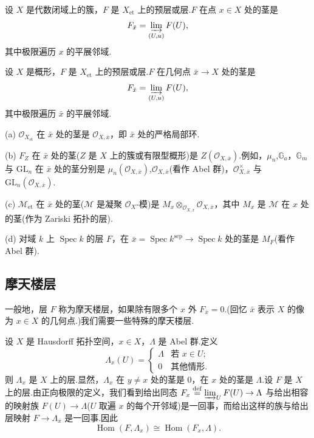 设 $X$ 是代数闭域上的簇，$F$ 是 $X_{\mathrm{et}}$ 上的预层或层.$F$ 在点 $x \in X$ 处的茎是
\[
F_{\bar{x}} = \varinjlim_{(U, u)} F(U),
\]
其中极限遍历 $x$ 的平展邻域.

设 $X$ 是概形，$F$ 是 $X_{\mathrm{et}}$ 上的预层或层.$F$ 在几何点 $\bar{x} \to X$ 处的茎是
\[
F_{\bar{x}} = \varinjlim_{(U, u)} F(U),
\]
其中极限遍历 $\bar{x}$ 的平展邻域.

\begin{example}\label{ex:6.13}
(a) $\mathcal{O}_{X_{\mathrm{et}}}$ 在 $\bar{x}$ 处的茎是 $\mathcal{O}_{X, \bar{x}}$，即 $\bar{x}$ 处的严格局部环.

(b) $F_Z$ 在 $\bar{x}$ 处的茎($Z$ 是 $X$ 上的簇或有限型概形)是 $Z(\mathcal{O}_{X, \bar{x}})$.例如，$\mu_n$,$\mathbb{G}_{a}$，$\mathbb{G}_{m}$ 与 $\mathrm{GL}_n$ 在 $\bar{x}$ 处的茎分别是 $\mu_n(\mathcal{O}_{X, \bar{x}})$,$\mathcal{O}_{X, \bar{x}}$(看作 Abel 群)，$\mathcal{O}^{\times}_{X, \bar{x}}$ 与 $\mathrm{GL}_n(\mathcal{O}_{X, \bar{x}})$.

(c) $\mathcal{M}_{\mathrm{et}}$ 在 $\bar{x}$ 处的茎($\mathcal{M}$ 是凝聚 $\mathcal{O}_X$-模)是 $M_x \otimes_{\mathcal{O}_{X, x}} \mathcal{O}_{X, \bar{x}}$，其中 $M_x$ 是 $\mathcal{M}$ 在 $x$ 处的茎(作为 Zariski 拓扑的层).

(d) 对域 $k$ 上 $\operatorname{Spec} k$ 的层 $F$，在 $\bar{x} = \operatorname{Spec} k^{\mathrm{sep}} \to \operatorname{Spec} k$ 处的茎是 $M_F$(看作 Abel 群).
\end{example}

\subsection*{摩天楼层}

一般地，层 $F$ 称为摩天楼层，如果除有限多个 $x$ 外 $F_{\bar{x}} = 0$.(回忆 $\bar{x}$ 表示 $X$ 的像为 $x \in X$ 的几何点.)我们需要一些特殊的摩天楼层.

设 $X$ 是 Hausdorff 拓扑空间，$x \in X$，$\Lambda$ 是 Abel 群.定义
\[
\Lambda_x(U) = \begin{cases}
\Lambda & \text{若 } x \in U;\\
0 & \text{其他情形}.
\end{cases}
\]
则 $\Lambda_x$ 是 $X$ 上的层.显然，$\Lambda_x$ 在 $y \neq x$ 处的茎是 0，在 $x$ 处的茎是 $\Lambda$.设 $F$ 是 $X$ 上的层.由正向极限的定义，我们看到给出同态 $F_x \overset{\mathrm{def}}{=} \varinjlim_{U} F(U) \to \Lambda$ 与给出相容的映射族 $F(U) \to \Lambda$($U$ 取遍 $x$ 的每个开邻域)是一回事，而给出这样的族与给出层映射 $F \to \Lambda_x$ 是一回事.因此
\[
\operatorname{Hom}(F, \Lambda_x) \cong \operatorname{Hom}(F_x, \Lambda).
\]

